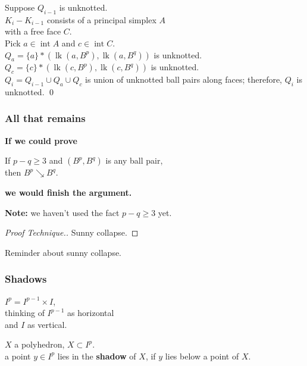 \documentclass[14pt]{beamer}
\newcommand{\collapses}{\searrow}
\newcommand{\join}{\ast}
\DeclareMathOperator{\lk}{lk}
\DeclareMathOperator{\interior}{int}
\newcommand{\setbackgroundpicture}[1]{%
\usebackgroundtemplate{
\begin{pgfpicture}{0in}{0in}{\paperwidth}{\paperheight}
\pgfputat{\pgfxy(0,0)}{\texttt{[image: \#1]}}
\color{white}
\pgfsetfillopacity{0.8}
\pgfrect[fill]{\pgfxy(0,0)}{\pgfpoint{\paperwidth}{\paperheight}}
\end{pgfpicture}
}
}
\newcommand{\clearbackgroundpicture}{\usebackgroundtemplate{}}
\begin{document}
\begin{frame}
  Suppose $Q_{i-1}$ is unknotted. \\\pause
  \vfill
  $K_i - K_{i-1}$ consists of a principal simplex $A$ \\with a free face
  $C$. \\\pause
  Pick $a \in \interior A$ and $c \in \interior C$. \\\pause
  \vfill
  $Q_a = \{a\} \join (\lk(a,B^p),\lk(a,B^q))$ is unknotted. \\\pause
  $Q_c = \{c\} \join (\lk(c,B^p),\lk(c,B^q))$ is unknotted. \\\pause
  \vfill
  $Q_i = Q_{i-1} \cup Q_a \cup Q_c$ is union of unknotted ball pairs
  along faces; therefore, $Q_i$ is unknotted. \pause\hfill\qed
\end{frame}


\begin{frame}
  \frametitle{All that remains}
  
  \textcolor{red!50!black}{\textbf{If we could prove}}
  \begin{lemma}
    If $p - q \geq 3$ and $(B^p,B^q)$ is any ball pair, \\
    then $B^p \collapses B^q$.
  \end{lemma}
  \textcolor{red!50!black}{\textbf{we would finish the argument.}}

  \pause\vfill
  \textbf{Note:} we haven't used the fact $p - q \geq 3$ yet.
  \pause\vfill
  \begin{proof}[Proof Technique.]
    Sunny collapse.
  \end{proof}
  \vfill\pause
\end{frame}


\setbackgroundpicture{stop-sign.jpg}
\begin{frame}
\pause
\vfill
\begin{center}
  Reminder about sunny collapse.
\end{center}
\end{frame}
\clearbackgroundpicture

\setbackgroundpicture{trees-with-shadows.jpg}
\begin{frame}
  \frametitle{Shadows}

  $I^p = I^{p-1} \times I$, \\
  thinking of $I^{p-1}$ as horizontal \\
  and $I$ as vertical.

  \vfill
  $X$ a polyhedron, $X \subset I^p$. \\
  a point $y \in I^p$ lies in the \textbf{shadow} of $X$, if $y$ lies
  below a point of $X$.
\end{frame}
\end{document}

